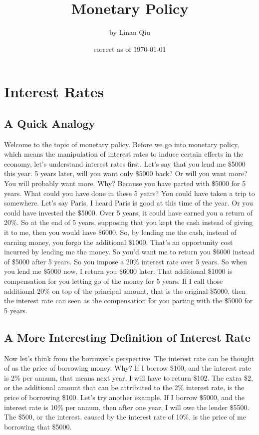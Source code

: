 \RequirePackage{../../dominatrix}

\title{Monetary Policy}
\author{\large by Linan Qiu}
\date{\small correct as of \today}

\maketitle
\tableofcontents
\section{Interest Rates}
\subsection{A Quick Analogy}
Welcome to the topic of monetary policy. Before we go into monetary policy, which means the manipulation of interest rates to induce certain effects in the economy, let’s understand interest rates first. Let’s say that you lend me \$5000 this year. 5 years later, will you want only \$5000 back? Or will you want more? You will probably want more. Why? Because you have parted with \$5000 for 5 years. What could you have done in these 5 years? You could have taken a trip to somewhere. Let’s say Paris. I heard Paris is good at this time of the year. Or you could have invested the \$5000. Over 5 years, it could have earned you a return of 20\%. So at the end of 5 years, supposing that you kept the cash instead of giving it to me, then you would have \$6000. So, by lending me the cash, instead of earning money, you forgo the additional \$1000. That’s an opportunity cost incurred by lending me the money. So you’d want me to return you \$6000 instead of \$5000 after 5 years. So you impose a 20\% interest rate over 5 years. So when you lend me \$5000 now, I return you \$6000 later. That additional \$1000 is compensation for you letting go of the money for 5 years. If I call those additional 20\% on top of the principal amount, that is the original \$5000, then the interest rate can seen as the compensation for you parting with the \$5000 for 5 years. 
\subsection{A More Interesting Definition of Interest Rate}
Now let’s think from the borrower’s perspective. The interest rate can be thought of as the price of borrowing money. Why? If I borrow \$100, and the interest rate is 2\% per annum, that means next year, I will have to return \$102. The extra \$2, or the additional amount that can be attributed to the 2\% interest rate, is the price of borrowing \$100. Let’s try another example. If I borrow \$5000, and the interest rate is 10\% per annum, then after one year, I will owe the lender \$5500. The \$500, or the interest, caused by the interest rate of 10\%, is the price of me borrowing that \$5000. 
